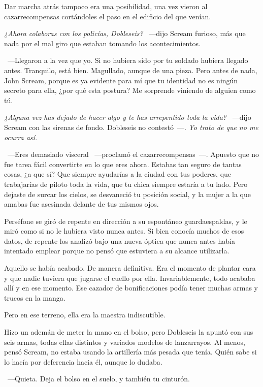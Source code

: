 Dar marcha atrás tampoco era una posibilidad, una vez vieron al cazarrecompensas cortándoles el paso en el edificio del que venían.

\emph{¿Ahora colaboras con los policías, Dobleseis?} ~---dijo Scream furioso, más que nada por el mal giro que estaban tomando los acontecimientos.

~---Llegaron a la vez que yo. Si no hubiera sido por tu soldado hubiera llegado antes. Tranquilo, está bien. Magullado, aunque de una pieza. Pero antes de nada, John Scream, porque es ya evidente para mí que tu identidad no es ningún secreto para ella, ¿por qué esta postura? Me sorprende viniendo de alguien como tú.

\emph{¿Alguna vez has dejado de hacer algo y te has arrepentido toda la vida?} ~---dijo Scream con las sirenas de fondo. Dobleseis no contestó~---. \emph{Yo trato de que no me ocurra así.}

~---Eres demasiado visceral ~---proclamó el cazarrecompensas~---. Apuesto que no fue tarea fácil convertirte en lo que eres ahora. Estabas tan seguro de tantas cosas, ¿a que sí? Que siempre ayudarías a la ciudad con tus poderes, que trabajarías de piloto toda la vida, que tu chica siempre estaría a tu lado. Pero dejaste de surcar los cielos, se desvaneció tu posición social, y la mujer a la que amabas fue asesinada delante de tus mismos ojos.

Perséfone se giró de repente en dirección a su espontáneo guardaespaldas, y le miró como si no le hubiera visto nunca antes. Si bien conocía muchos de esos datos, de repente los analizó bajo una nueva óptica que nunca antes había intentado emplear porque no pensó que estuviera a su alcance utilizarla.

Aquello se había acabado. De manera definitiva. Era el momento de plantar cara y que nadie tuviera que jugarse el cuello por ella. Invariablemente, todo acababa allí y en ese momento. Ese cazador de bonificaciones podía tener muchas armas y trucos en la manga.

Pero en ese terreno, ella era la maestra indiscutible.

Hizo un ademán de meter la mano en el bolso, pero Dobleseis la apuntó con sus seis armas, todas ellas distintos y variados modelos de lanzarrayos. Al menos, pensó Scream, no estaba usando la artillería más pesada que tenía. Quién sabe si lo hacía por deferencia hacia él, aunque lo dudaba.

~---Quieta. Deja el bolso en el suelo, y también tu cinturón.

